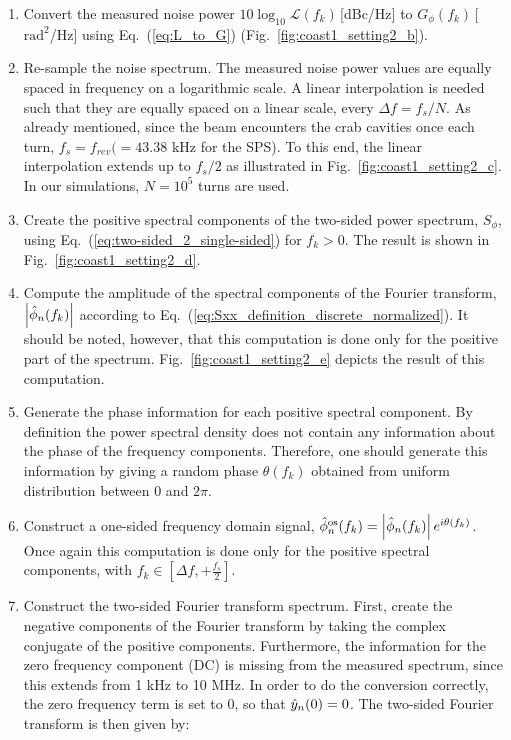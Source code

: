 \begin{enumerate}
    \item Convert the measured noise power $10\log_{10}\mathcal{L}(f_k)$\,[dBc/Hz] to $G_\phi(f_k)$\,[$\mathrm{rad^2}$/Hz] using Eq.~(\ref{eq:L_to_G}) (Fig.~\ref{fig:coast1_setting2_b}).
    \item Re-sample the noise spectrum. The measured noise power values are equally spaced in frequency on a logarithmic scale. A linear interpolation is needed such that they are equally spaced on a linear scale, every $\Delta f = f_s/N$. As already mentioned, since the beam encounters the crab cavities once each turn, $f_s=f_{rev}(=43.38$ kHz for the SPS). To this end, the linear interpolation extends up to $f_s/2$ as illustrated in Fig.~\ref{fig:coast1_setting2_c}. In our simulations, $N=10^5$ turns are used.
    \item Create the positive spectral components of the two-sided power spectrum, $S_\phi$, using Eq.~(\ref{eq:two-sided_2_single-sided}) for $f_k>0$. The result is shown in Fig.~\ref{fig:coast1_setting2_d}.
    \item Compute the amplitude of the spectral components of the Fourier transform, $\left | \hat{\phi}_n(f_k) \right | $ according to Eq.~(\ref{eq:Sxx_definition_discrete_normalized}). It should be noted, however, that this computation is done only for the positive part of the spectrum. Fig.~\ref{fig:coast1_setting2_e} depicts the result of this computation. 
    \item Generate the phase information for each positive spectral component. By definition the power spectral density does not contain any information about the phase of the frequency components. Therefore, one should generate this information by giving a random phase $\theta(f_k)$ obtained from uniform distribution between 0 and $2\pi$.
    \item Construct a one-sided frequency domain signal, $\hat{\phi}_n^\mathrm{os}(f_k) =\left| \hat{\phi}_n(f_k) \right| e^{{i} \theta(f_k)}$.  Once again this computation is done only for the positive spectral components, with $f_k \in \left[\Delta f,+\frac{f_s}{2} \right ]$.
    \item Construct the two-sided Fourier transform spectrum. First, create the negative components of the Fourier transform by taking the complex conjugate of the positive components. Furthermore, the information for the zero frequency component (DC) is missing from the measured spectrum, since this extends from  1 kHz to 10 MHz. In order to do the conversion correctly, the zero frequency term is set to 0, so that $\hat{y}_n(0)=0$. The two-sided Fourier transform is then given by:
    


\end{enumerate}

